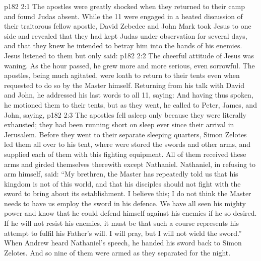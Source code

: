 \vs p182 2:1 The apostles were greatly shocked when they returned to their camp and found Judas absent. While the 11 were engaged in a heated discussion of their traitorous fellow apostle, David Zebedee and John Mark took Jesus to one side and revealed that they had kept Judas under observation for several days, and that they knew he intended to betray him into the hands of his enemies. Jesus listened to them but only said: 
\vs p182 2:2 The cheerful attitude of Jesus was waning. As the hour passed, he grew more and more serious, even sorrowful. The apostles, being much agitated, were loath to return to their tents even when requested to do so by the Master himself. Returning from his talk with David and John, he addressed his last words to all 11, saying:  And having thus spoken, he motioned them to their tents, but as they went, he called to Peter, James, and John, saying, 
\vs p182 2:3 The apostles fell asleep only because they were literally exhausted; they had been running short on sleep ever since their arrival in Jerusalem. Before they went to their separate sleeping quarters, Simon Zelotes led them all over to his tent, where were stored the swords and other arms, and supplied each of them with this fighting equipment. All of them received these arms and girded themselves therewith except Nathaniel. Nathaniel, in refusing to arm himself, said: “My brethren, the Master has repeatedly told us that his kingdom is not of this world, and that his disciples should not fight with the sword to bring about its establishment. I believe this; I do not think the Master needs to have us employ the sword in his defence. We have all seen his mighty power and know that he could defend himself against his enemies if he so desired. If he will not resist his enemies, it must be that such a course represents his attempt to fulfil his Father’s will. I will pray, but I will not wield the sword.” When Andrew heard Nathaniel’s speech, he handed his sword back to Simon Zelotes. And so nine of them were armed as they separated for the night.
